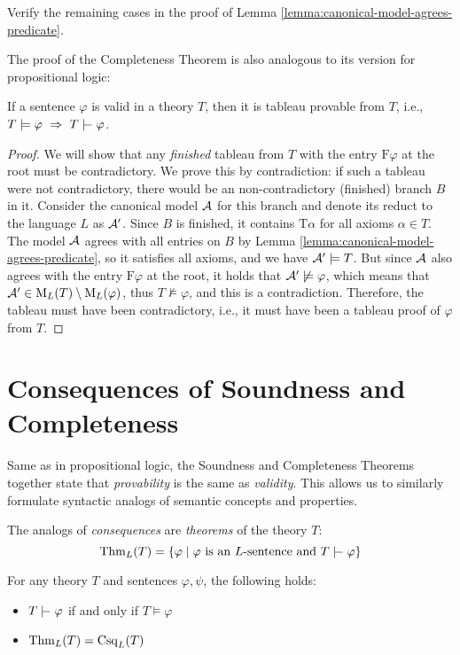 \begin{exercise}
    Verify the remaining cases in the proof of Lemma \ref{lemma:canonical-model-agrees-predicate}.
\end{exercise}

The proof of the Completeness Theorem is also analogous to its version for propositional logic:

\begin{theorem}[On Completeness]\label{theorem:completeness-theorem-predicate}
    If a sentence $\varphi$ is valid in a theory $T$, then it is tableau provable from $T$, i.e., $T\models\varphi\ \Rightarrow\ T\proves\varphi$.    
\end{theorem} 

\begin{proof}
We will show that any \emph{finished} tableau from $T$ with the entry $\mathrm{F}\varphi$ at the root must be contradictory. We prove this by contradiction: if such a tableau were not contradictory, there would be an non-contradictory (finished) branch $B$ in it. Consider the canonical model $\mathcal{A}$ for this branch and denote its reduct to the language $L$ as $\mathcal{A}'$. Since $B$ is finished, it contains $\mathrm{T}\alpha$ for all axioms $\alpha\in T$. The model $\mathcal{A}$ agrees with all entries on $B$ by Lemma \ref{lemma:canonical-model-agrees-predicate}, so it satisfies all axioms, and we have $\mathcal{A}'\models T$. But since $\mathcal{A}$ also agrees with the entry $\mathrm{F}\varphi$ at the root, it holds that $\mathcal{A}'\not\models\varphi$, which means that $\mathcal{A}'\in \operatorname{M}_L(T)\setminus\operatorname{M}_L(\varphi)$, thus $T\not\models\varphi$, and this is a contradiction. Therefore, the tableau must have been contradictory, i.e., it must have been a tableau proof of $\varphi$ from $T$.
\end{proof}


\section{Consequences of Soundness and Completeness}

Same as in propositional logic, the Soundness and Completeness Theorems together state that \emph{provability} is the same as \emph{validity}. This allows us to similarly formulate syntactic analogs of semantic concepts and properties.

The analogs of \emph{consequences} are \emph{theorems} of the theory $T$:
$$
\Thm_L(T)=\{\varphi\mid \varphi\text{ is an $L$-sentence and } T\proves\varphi\}
$$

\begin{corollary}[Provability = Validity]\label{corollary:corollary-of-soundness-and-completeness-predicate}
    For any theory $T$ and sentences $\varphi,\psi$, the following holds:
    \begin{itemize}
        \item $T\proves\varphi$ if and only if $T\models\varphi$
        \item $\operatorname{Thm}_L(T)=\operatorname{Csq}_L(T)$
    \end{itemize}
\end{corollary}

